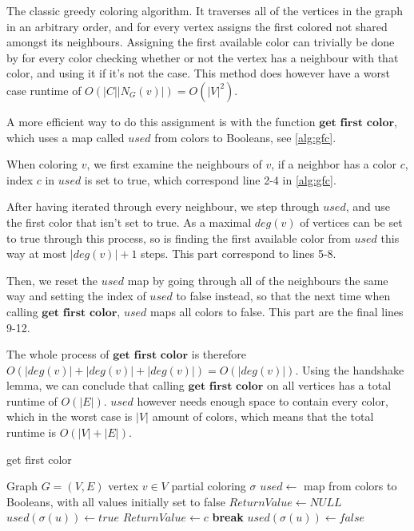 \documentclass[a4paper]{article}
\newcommand{\algorithmicbreak}{\textbf{break}}
\newcommand{\BREAK}{\STATE \algorithmicbreak}
\begin{document}
The classic greedy coloring algorithm. It traverses all of the vertices in the graph
in an arbitrary order, and for every vertex assigns the first colored not shared
amongst its neighbours. Assigning the first available color can trivially be done
by for every color checking whether or not the vertex has a neighbour with that color,
and using it if it's not the case. This method does however
have a worst case runtime of $O(|C||N_G(v)|) = O(|V|^2)$. 

A more efficient way to do this assignment is with the function 
$\textbf{get first color}$, 
which uses a map called $used$ from colors to Booleans, see
\autoref{alg:gfc}.

When coloring $v$, we first examine the
neighbours of $v$, if a neighbor has a color $c$, index $c$ in $used$ is set to
true, which correspond line 2-4 in \autoref{alg:gfc}. 

After having iterated through every neighbour, we step through $used$,
and use the first color that isn't set to true. As a maximal $deg(v)$ of
vertices can be set to true through this process, so is finding the first available
color from $used$ this way at most  $|deg(v)|+1$ steps. This part correspond to lines
5-8.

Then, we reset the
$used$ map by going through all of the neighbours the same way and setting the
index of $used$ to false instead, so that the next time when calling
$\textbf{get first color}$, $used$ maps all colors to false. This part are the
final lines 9-12.

The whole process
of $\textbf{get first color}$ is therefore $O(|deg(v)|+|deg(v)| + |deg(v)|) =
O(|deg(v)|)$. Using the handshake lemma, we can conclude that calling
$\textbf{get first color}$ on all vertices has a total runtime of $O(|E|)$.
$used$ however needs enough space to contain every color, which in the worst
case is $|V|$ amount of colors, which means that the total runtime is
$O(|V|+|E|)$.



\begin{algorithm}[H]
  \caption{get first color}
  \label{alg:gfc}
  \begin{algorithmic}[1]
      \REQUIRE Graph $G = (V,E)$
      \REQUIRE vertex $v \in V$
      \REQUIRE partial coloring $\sigma$
      \REQUIRE $used \leftarrow $ map from colors to Booleans, with all values
      initially set to false
        \STATE $ReturnValue \leftarrow NULL$
                \STATE $used(\sigma(u)) \leftarrow true$
            \ENDIF
        \ENDFOR
                \STATE $ReturnValue \leftarrow c$
                \BREAK
            \ENDIF
        \ENDFOR
                \STATE $used(\sigma(u)) \leftarrow false$
            \ENDIF
        \ENDFOR
  \end{algorithmic}
\end{algorithm}
\end{document}
